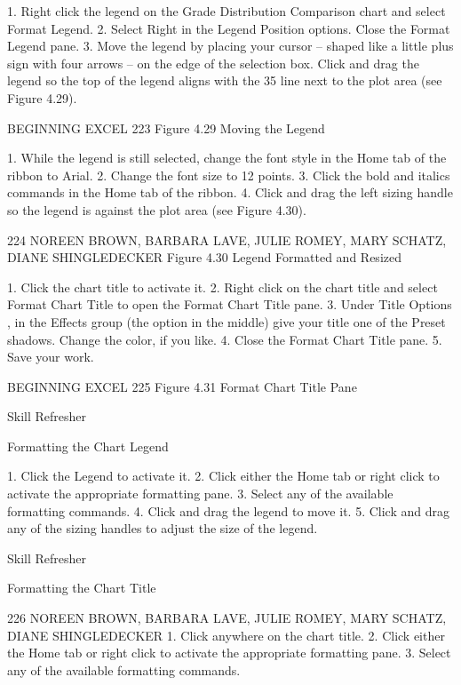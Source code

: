 1. Right click the legend on the Grade Distribution Comparison chart and select Format Legend.
2. Select Right in the Legend Position options. Close the Format Legend pane.
3. Move the legend by placing your cursor – shaped like a little plus sign with four arrows – on the
edge of the selection box. Click and drag the legend so the top of the legend aligns with the 35%
line next to the plot area (see Figure 4.29).




BEGINNING EXCEL 223
Figure 4.29 Moving the Legend


1.   While the legend is still selected, change the font style in the Home tab of the ribbon to Arial.
2.   Change the font size to 12 points.
3.   Click the bold and italics commands in the Home tab of the ribbon.
4.   Click and drag the left sizing handle so the legend is against the plot area (see Figure 4.30).




224 NOREEN BROWN, BARBARA LAVE, JULIE ROMEY, MARY SCHATZ, DIANE SHINGLEDECKER
Figure 4.30 Legend Formatted and Resized


1. Click the chart title to activate it.
2. Right click on the chart title and select Format Chart Title to open the Format Chart Title
pane.
3. Under Title Options , in the Effects group (the option in the middle) give your title one of the
Preset shadows. Change the color, if you like.
4. Close the Format Chart Title pane.
5. Save your work.




BEGINNING EXCEL 225
Figure 4.31 Format Chart Title Pane




Skill Refresher


Formatting the Chart Legend

1. Click the Legend to activate it.
2. Click either the Home tab or right click to activate the appropriate formatting pane.
3. Select any of the available formatting commands.
4. Click and drag the legend to move it.
5. Click and drag any of the sizing handles to adjust the size of the legend.




Skill Refresher


Formatting the Chart Title




226 NOREEN BROWN, BARBARA LAVE, JULIE ROMEY, MARY SCHATZ, DIANE SHINGLEDECKER
1. Click anywhere on the chart title.
2. Click either the Home tab or right click to activate the appropriate formatting pane.
3. Select any of the available formatting commands.



